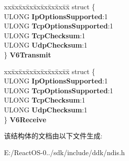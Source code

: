 \begin{DoxyCompactItemize}
\begin{tabbing}
\end{tabbing}\item 
\mbox{\label{struct___n_d_i_s___t_a_s_k___t_c_p___i_p___c_h_e_c_k_s_u_m_ae82d6627d9d2da3aeb37c47541c623c3}} 
\begin{tabbing}
xx\=xx\=xx\=xx\=xx\=xx\=xx\=xx\=xx\=\kill
struct \{\\
\>ULONG {\bfseries IpOptionsSupported}:1\\
\>ULONG {\bfseries TcpOptionsSupported}:1\\
\>ULONG {\bfseries TcpChecksum}:1\\
\>ULONG {\bfseries UdpChecksum}:1\\
\} {\bfseries V6Transmit}\\

\end{tabbing}\item 
\mbox{\label{struct___n_d_i_s___t_a_s_k___t_c_p___i_p___c_h_e_c_k_s_u_m_a3233e1ac3aa29e9cffee0029e01be92b}} 
\begin{tabbing}
xx\=xx\=xx\=xx\=xx\=xx\=xx\=xx\=xx\=\kill
struct \{\\
\>ULONG {\bfseries IpOptionsSupported}:1\\
\>ULONG {\bfseries TcpOptionsSupported}:1\\
\>ULONG {\bfseries TcpChecksum}:1\\
\>ULONG {\bfseries UdpChecksum}:1\\
\} {\bfseries V6Receive}\\

\end{tabbing}\end{DoxyCompactItemize}


该结构体的文档由以下文件生成\+:\begin{DoxyCompactItemize}
\item 
E\+:/\+React\+O\+S-\/0../sdk/include/ddk/ndis.\+h\end{DoxyCompactItemize}
